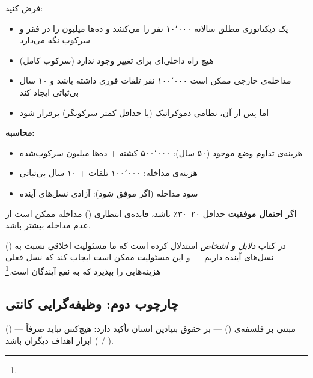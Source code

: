 \begin{tcolorbox}[wavebox, title={استدلال فایده‌گرایانه به نفع نجات‌طلبی فداکارانه}]
فرض کنید:
\begin{itemize}
\item یک دیکتاتوری مطلق سالانه ۱۰٬۰۰۰ نفر را می‌کشد و ده‌ها میلیون را در فقر و سرکوب نگه می‌دارد
\item هیچ راه داخلی‌ای برای تغییر وجود ندارد (سرکوب کامل)
\item مداخله‌ی خارجی ممکن است ۱۰۰٬۰۰۰ نفر تلفات فوری داشته باشد و ۱۰ سال بی‌ثباتی ایجاد کند
\item اما پس از آن، نظامی دموکراتیک (یا حداقل کمتر سرکوبگر) برقرار شود
\end{itemize}

\textbf{محاسبه:}
\begin{itemize}
\item هزینه‌ی تداوم وضع موجود (۵۰ سال): ۵۰۰٬۰۰۰ کشته + ده‌ها میلیون سرکوب‌شده
\item هزینه‌ی مداخله: ۱۰۰٬۰۰۰ تلفات + ۱۰ سال بی‌ثباتی
\item سود مداخله (اگر موفق شود): آزادی نسل‌های آینده
\end{itemize}

اگر \textbf{احتمال موفقیت} حداقل ۲۰–۳۰٪ باشد، فایده‌ی انتظاری () مداخله ممکن است از عدم مداخله بیشتر باشد.
\end{tcolorbox}

 () در کتاب \textit{دلایل و اشخاص} استدلال کرده است که ما مسئولیت اخلاقی نسبت به نسل‌های آینده داریم — و این مسئولیت ممکن است ایجاب کند که نسل فعلی هزینه‌هایی را بپذیرد که به نفع آیندگان است.\footnote{}

\subsection{چارچوب دوم: وظیفه‌گرایی کانتی}
\label{subsec:ch15-kantian}

 () — مبتنی بر فلسفه‌ی  () — بر حقوق بنیادین انسان تأکید دارد: هیچ‌کس نباید صرفاً ابزار اهداف دیگران باشد ( / ).

